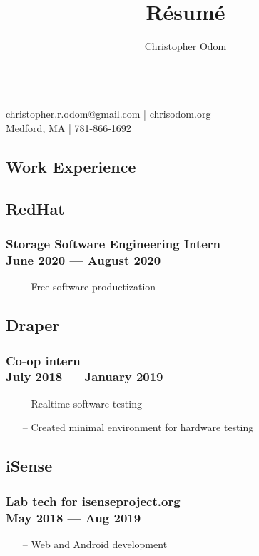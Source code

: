 \documentclass[11pt]{article}
\makeatletter
\renewcommand{\maketitle}
{
	\Huge \noindent \theauthor \\
	\large\noindent christopher.r.odom@gmail.com | chrisodom.org \\
	Medford, MA | 781-866-1692
}
\makeatother
\begin{document}
\setlength\multicolsep{0pt}


\title{R\'esum\'e}

\author{Christopher Odom}

\maketitle

\color{darkgrey}
\vspace{1em}

\begin{multicols}{2}

\section{Work Experience}

\subsection{RedHat}
\subsubsection{Storage Software Engineering Intern\\ June 2020 --- August 2020}
\begin{itemize}[noitemsep, topsep=0pt]
	\item[--] Free software productization
\end{itemize}

\subsection{Draper}
\subsubsection{Co-op intern\\ July 2018 --- January 2019}
\begin{itemize}[noitemsep, topsep=0pt]
	\item[--] Realtime software testing
	\item[--] Created minimal environment for hardware testing
\end{itemize}

\subsection{iSense}
\subsubsection{Lab tech for isenseproject.org\\ May 2018 --- Aug 2019}
\begin{itemize}[noitemsep, topsep=0pt]
	\item[--] Web and Android development
\end{itemize}


\end{multicols}
\end{document}
